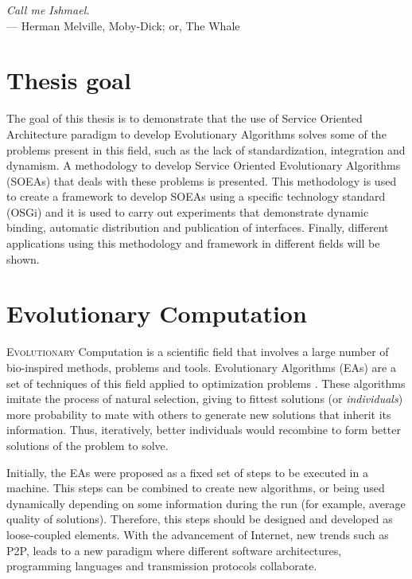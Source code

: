 \label{chap:introduction}
\begin{flushright}{\slshape
    Call me Ishmael.} \\ \medskip
    --- {Herman Melville, Moby-Dick; or, The Whale}
\end{flushright}
\minitoc\mtcskip
\vfill



\section{Thesis goal} %
The goal of this thesis is to demonstrate that the use of Service Oriented Architecture paradigm to develop Evolutionary Algorithms solves some of the problems present in this field, such as the lack of standardization, integration and dynamism. A methodology to develop Service Oriented Evolutionary Algorithms (SOEAs) that deals with these problems is presented. This methodology is used to create a framework to develop SOEAs using a specific technology standard (OSGi) and it is used to carry out experiments that demonstrate dynamic binding, automatic distribution and publication of interfaces. Finally, different applications using this methodology and framework in different fields will be shown.

\section{Evolutionary Computation}
\label{sec:intro:eas}

\lettrine{E}{volutionary} Computation is a scientific field that involves a large number of bio-inspired methods, problems and tools. Evolutionary Algorithms (EAs) are a set of techniques of this field applied to optimization problems \cite{eiben2010whatis}. These algorithms imitate the process of natural selection, giving to fittest solutions (or {\em individuals}) more probability to mate with others to generate new solutions that inherit its information. Thus, iteratively, better individuals would recombine to form better solutions of the problem to solve.

Initially, the EAs were proposed as a fixed set of steps to be executed in a machine. This steps can be combined to create new algorithms, or being used dynamically depending on some information during the run (for example, average quality of solutions). Therefore, this steps should be designed and developed as loose-coupled elements. With the advancement of Internet, new trends such as P2P, leads to a new paradigm where different software architectures, programming languages and transmission protocols collaborate. 

